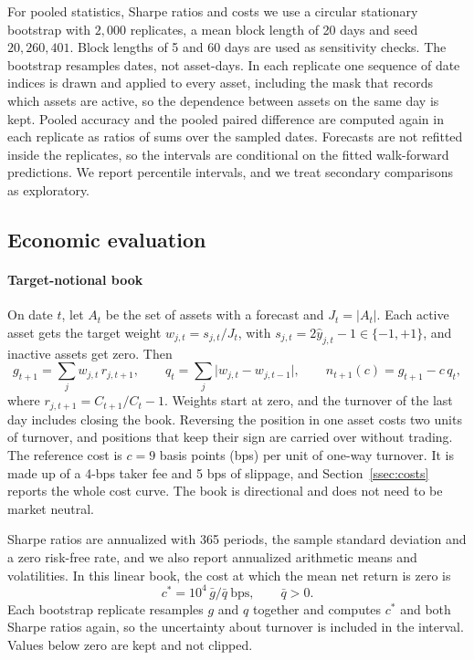 \documentclass[preprint,12pt,authoryear,a4paper]{elsarticle}
\begin{document}
For pooled statistics, Sharpe ratios and costs we use a circular stationary
bootstrap with $2{,}000$ replicates, a mean block length of 20 days and seed
$20{,}260{,}401$. Block lengths of 5 and 60 days are used as sensitivity checks. The
bootstrap resamples dates, not asset-days. In each replicate one sequence of date
indices is drawn and applied to every asset, including the mask that records which
assets are active, so the dependence between assets on the same day is kept. Pooled
accuracy and the pooled paired difference are computed again in each replicate as
ratios of sums over the sampled dates. Forecasts are not refitted inside the
replicates, so the intervals are conditional on the fitted walk-forward
predictions. We report percentile intervals, and we treat secondary comparisons as
exploratory.

\subsection{Economic evaluation}\label{ssec:econ}

\paragraph{Target-notional book} On date $t$, let $A_t$ be the set of assets with a
forecast and $J_t=|A_t|$. Each active asset gets the target weight
$w_{j,t}=s_{j,t}/J_t$, with $s_{j,t}=2\hat y_{j,t}-1\in\{-1,+1\}$, and inactive
assets get zero. Then
\begin{equation}
g_{t+1}=\sum_j w_{j,t}\,r_{j,t+1},\qquad
q_t=\sum_j\bigl|w_{j,t}-w_{j,t-1}\bigr|,\qquad
n_{t+1}(c)=g_{t+1}-c\,q_t,
\label{eq:book}
\end{equation}
where $r_{j,t+1}=C_{t+1}/C_t-1$. Weights start at zero, and the turnover of the
last day includes closing the book. Reversing the position in one asset costs two
units of turnover, and positions that keep their sign are carried over without
trading. The reference cost is $c=9$ basis points (bps) per unit of one-way
turnover. It is made up of a 4-bps taker fee and 5 bps of slippage, and
Section~\ref{ssec:costs} reports the whole cost curve. The book is directional and
does not need to be market neutral.

Sharpe ratios are annualized with 365 periods, the sample standard deviation and a
zero risk-free rate, and we also report annualized arithmetic means and
volatilities. In this linear book, the cost at which the mean net return is zero is
\begin{equation}
c^{*}=10^{4}\,\bar g/\bar q\ \text{bps},\qquad \bar q>0.
\label{eq:root}
\end{equation}
Each bootstrap replicate resamples $g$ and $q$ together and computes $c^{*}$ and
both Sharpe ratios again, so the uncertainty about turnover is included in the
interval. Values below zero are kept and not clipped.
\end{document}

